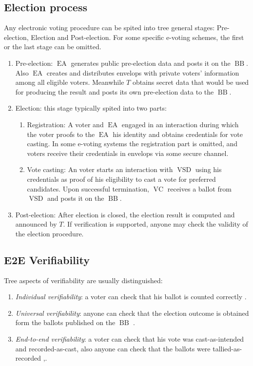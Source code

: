 \documentclass[12pt]{article}
\DeclareMathOperator{\vsd}{VSD}
\DeclareMathOperator{\ea}{EA}
\DeclareMathOperator{\bb}{BB}
\DeclareMathOperator{\voc}{VC}
\begin{document}
\subsection{Election process}
Any electronic voting procedure can be spited into tree general stages: Pre-election, Election and Post-election. For some specific e-voting schemes, the first or the last stage can be omitted.\\
\begin{enumerate}
\item Pre-election: $\ea$ generates public pre-election data and posts it on the $\bb$. Also $\ea$ creates and distributes envelops with private voters' information among all eligible voters. Meanwhile $T$ obtains secret data that would be used for producing the result and posts its own pre-election data to the $\bb$. 
\item Election: this stage typically spited into two parts:
\begin{enumerate}
\item Registration: A voter and $\ea$ engaged in an interaction during which the voter proofs to the $\ea$ his identity and obtains credentials for vote casting. In some e-voting systems the registration part is omitted, and voters receive their credentials in envelops via some secure channel. 
\item Vote casting: An voter starts an interaction with $\vsd$ using his credentials as proof of his eligibility to cast a vote for preferred candidates. Upon successful termination, $\voc$ receives a ballot from $\vsd$ and posts it on the $\bb$. 
\end{enumerate}
\item Post-election: After election is closed, the election result is computed and announced by $T$.  If verification is supported, anyone may check the validity of the election procedure. 
\end{enumerate}

\subsection{E2E Verifiability}
Tree aspects of verifiability are usually distinguished:
\begin{enumerate}
\item \textit{Individual verifiability}: a voter can check that his ballot is counted correctly \cite{Chaum1981}.
\item \textit{Universal verifiability}: anyone can check that the election outcome is obtained form the ballots published on the $\bb$ \cite{Sako1995}.
\item \textit{End-to-end verifiability}: a voter can check that his vote was cast-as-intended and recorded-as-cast, also anyone can check that the ballots were tallied-as-recorded \cite{Neff2004},\cite{Chaum2004}.
\end{enumerate}
\end{document}
